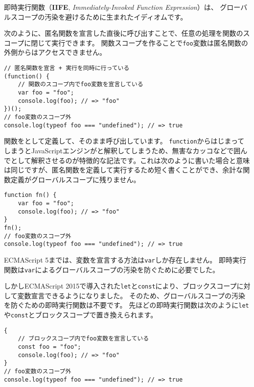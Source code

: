 \begin{tcolorbox}[enhanced jigsaw,breakable,title=即時実行関数]\label{immediate-function}

即時実行関数（\textbf{IIFE}, \emph{Immediately-Invoked Function
Expression}）は、
グローバルスコープの汚染を避けるために生まれたイディオムです。

次のように、匿名関数を宣言した直後に呼び出すことで、任意の処理を関数のスコープに閉じて実行できます。
関数スコープを作ることで\texttt{foo}変数は匿名関数の外側からはアクセスできません。

\begin{lstlisting}
// 匿名関数を宣言 + 実行を同時に行っている
(function() {
    // 関数のスコープ内でfoo変数を宣言している
    var foo = "foo";
    console.log(foo); // => "foo"
})();
// foo変数のスコープ外
console.log(typeof foo === "undefined"); // => true
\end{lstlisting}

関数を\textbf{}として定義して、そのまま呼び出しています。
\texttt{function}からはじまってしまうとJavaScriptエンジンが\textbf{}と解釈してしまうため、無害なカッコなどで囲んで\textbf{}として解釈させるのが特徴的な記法です。これは次のように書いた場合と意味は同じですが、匿名関数を定義して実行するため短く書くことができ、余計な関数定義がグローバルスコープに残りません。

\begin{lstlisting}
function fn() {
    var foo = "foo";
    console.log(foo); // => "foo"
}
fn();
// foo変数のスコープ外
console.log(typeof foo === "undefined"); // => true
\end{lstlisting}

ECMAScript
5までは、変数を宣言する方法は\texttt{var}しか存在しません。
即時実行関数は\texttt{var}によるグローバルスコープの汚染を防ぐために必要でした。

しかしECMAScript
2015で導入された\texttt{let}と\texttt{const}により、ブロックスコープに対して変数宣言できるようになりました。
そのため、グローバルスコープの汚染を防ぐための即時実行関数は不要です。
先ほどの即時実行関数は次のように\texttt{let}や\texttt{const}とブロックスコープで置き換えられます。

\begin{lstlisting}
{
    // ブロックスコープ内でfoo変数を宣言している
    const foo = "foo";
    console.log(foo); // => "foo"
}
// foo変数のスコープ外
console.log(typeof foo === "undefined"); // => true
\end{lstlisting}
\end{tcolorbox}

